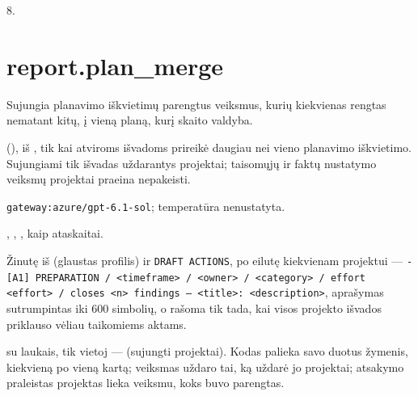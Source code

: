  8.


\section{report.plan\_merge}\label{sec:aprompts:report-plan_merge}

 Sujungia planavimo iškvietimų parengtus veiksmus, kurių kiekvienas
rengtas nematant kitų, į vieną planą, kurį skaito valdyba.

  (), iš
, tik kai atviroms išvadoms prireikė daugiau nei vieno planavimo
iškvietimo. Sujungiami tik išvadas uždarantys projektai; taisomųjų ir faktų nustatymo veiksmų
projektai praeina nepakeisti.

 \texttt{gateway:azure/gpt-6.1-sol}; temperatūra
nenustatyta.

 , , , kaip
ataskaitai.

 Žinutę iš  (glaustas profilis) ir
\texttt{DRAFT ACTIONS}, po eilutę kiekvienam projektui --- \texttt{- [A1] PREPARATION / <timeframe> / <owner> / <category> / effort <effort> / closes <n> findings — <title>: <description>}, aprašymas
sutrumpintas iki 600 simbolių, o  rašoma tik tada, kai visos projekto išvados
priklauso vėliau taikomiems aktams.

  su  laukais, tik
vietoj  ---  (sujungti projektai). Kodas palieka savo duotus
žymenis, kiekvieną po vieną kartą; veiksmas uždaro tai, ką uždarė jo projektai; atsakymo
praleistas projektas lieka veiksmu, koks buvo parengtas.

